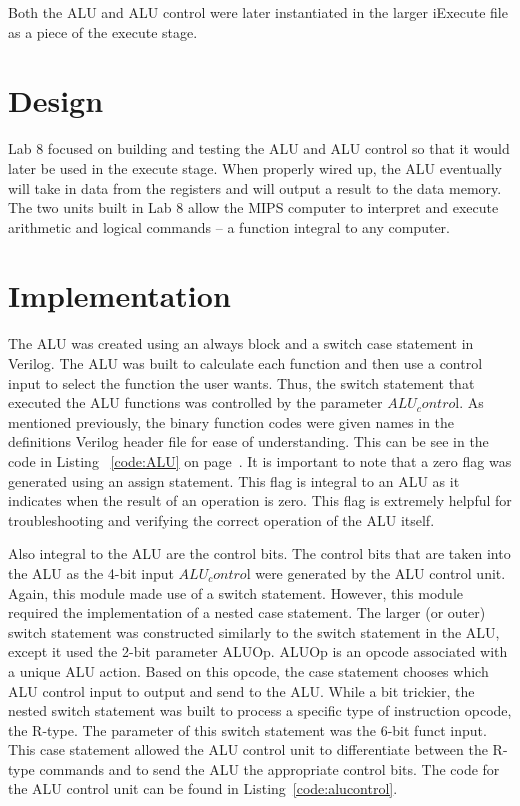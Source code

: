 \documentclass{article}
\begin{document}
Both the ALU and ALU control were later instantiated in the larger iExecute file as a piece of the execute stage.

\section{Design}

Lab 8 focused on building and testing the ALU and ALU control so that it would later be used in the execute stage. When properly wired up, the ALU eventually will take in data from the registers and will output a result to the data memory. The two units built in Lab 8 allow the MIPS computer to interpret and execute arithmetic and logical commands -- a function integral to any computer. 


\section{Implementation}

The ALU was created using an always block and a switch case statement in Verilog. The ALU was built to calculate each function and then use a control input to select the function the user wants. Thus, the switch statement that executed the ALU functions was controlled by the parameter $ALU_contro$l. As mentioned previously, the binary function codes were given names in the definitions Verilog header file for ease of understanding. This can be see in the code in Listing ~\ref{code:ALU} on page~\pageref{code:ALU}. It is important to note that a zero flag was generated using an assign statement. This flag is integral to an ALU as it indicates when the result of an operation is zero. This flag is extremely helpful for troubleshooting and verifying the correct operation of the ALU itself.

Also integral to the ALU are the control bits. The control bits that are taken into the ALU as the 4-bit input $ALU_contro$l were generated by the ALU control unit. Again, this module made use of a switch statement. However, this module required the implementation of a nested case statement. The larger (or outer) switch statement was constructed similarly to the switch statement in the ALU, except it used the 2-bit parameter ALUOp. ALUOp is an opcode associated with a unique ALU action. Based on this opcode, the case statement chooses which ALU control input to output and send to the ALU. While a bit trickier, the nested switch statement was built to process a specific type of instruction opcode, the R-type. The parameter of this switch statement was the 6-bit funct input. This case statement allowed the ALU control unit to differentiate between the R-type commands and to send the ALU the appropriate control bits. The code for the ALU control unit can be found in Listing~\ref{code:alucontrol}.
\end{document}
